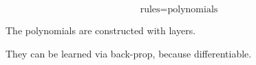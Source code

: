 

\title{}
\author{ {\footnotesize general.intelligence@gmail.com}}



	\setlength{\parindent}{0pt}
	\setlength{\parskip}{2.8ex plus0.8ex minus0.8ex}
	
	\maketitle
	
	\tableofcontents
	
\begin{abstract}
\end{abstract}

\begin{equation}
\mbox{rules} = \mbox{polynomials}
\end{equation}

The polynomials are constructed with layers.

They can be learned via back-prop, because differentiable.



